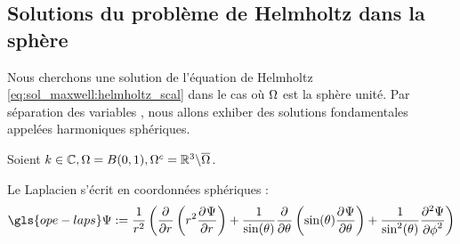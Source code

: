 \subsection{Solutions du problème de Helmholtz dans la sphère}
\label{sec:helmholtz_scal}

Nous cherchons une solution de l'équation de Helmholtz \eqref{eq:sol_maxwell:helmholtz_scal} dans le cas où \(\Omega\) est la sphère unité. Par séparation des variables%
, nous allons exhiber des solutions fondamentales appelées harmoniques sphériques.

Soient \(k \in \mathbb C, \Omega = B(0,1), \Omega^c = \mathbb R^3 \backslash \overline{\Omega}\).

Le Laplacien s'écrit en coordonnées sphériques :
\[
  \gls{ope-laps} \Psi := \frac{1}{r^2}\left(
  \ddr{r}{}\left(r^2\ddr{r}{\Psi}\right)
  + \frac{1}{\sin(\theta)}\ddr{\theta}{}\left(\sin(\theta)\ddr{\theta}{\Psi}\right)
  + \frac{1}{\sin^2(\theta)} \ddr[2]{\phi}{\Psi}\right)
\]

